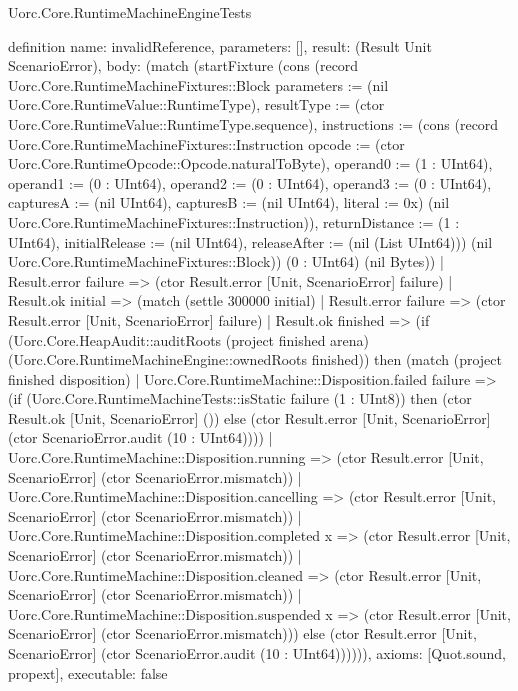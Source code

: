 \begin{lexlean}{Uorc.Core.RuntimeMachineEngineTests}
\begin{semanticmodule}
definition{
  name: invalidReference,
  parameters: [],
  result: (Result Unit ScenarioError),
  body: (match (startFixture (cons (record Uorc.Core.RuntimeMachineFixtures::Block {parameters := (nil Uorc.Core.RuntimeValue::RuntimeType), resultType := (ctor Uorc.Core.RuntimeValue::RuntimeType.sequence), instructions := (cons (record Uorc.Core.RuntimeMachineFixtures::Instruction {opcode := (ctor Uorc.Core.RuntimeOpcode::Opcode.naturalToByte), operand0 := (1 : UInt64), operand1 := (0 : UInt64), operand2 := (0 : UInt64), operand3 := (0 : UInt64), capturesA := (nil UInt64), capturesB := (nil UInt64), literal := 0x}) (nil Uorc.Core.RuntimeMachineFixtures::Instruction)), returnDistance := (1 : UInt64), initialRelease := (nil UInt64), releaseAfter := (nil (List UInt64))}) (nil Uorc.Core.RuntimeMachineFixtures::Block)) (0 : UInt64) (nil Bytes))
    | Result.error failure => (ctor Result.error [Unit, ScenarioError] failure)
    | Result.ok initial => (match (settle 300000 initial)
      | Result.error failure => (ctor Result.error [Unit, ScenarioError] failure)
      | Result.ok finished => (if (Uorc.Core.HeapAudit::auditRoots (project finished arena) (Uorc.Core.RuntimeMachineEngine::ownedRoots finished)) then (match (project finished disposition)
        | Uorc.Core.RuntimeMachine::Disposition.failed failure => (if (Uorc.Core.RuntimeMachineTests::isStatic failure (1 : UInt8)) then (ctor Result.ok [Unit, ScenarioError] ()) else (ctor Result.error [Unit, ScenarioError] (ctor ScenarioError.audit (10 : UInt64))))
        | Uorc.Core.RuntimeMachine::Disposition.running => (ctor Result.error [Unit, ScenarioError] (ctor ScenarioError.mismatch))
        | Uorc.Core.RuntimeMachine::Disposition.cancelling => (ctor Result.error [Unit, ScenarioError] (ctor ScenarioError.mismatch))
        | Uorc.Core.RuntimeMachine::Disposition.completed x => (ctor Result.error [Unit, ScenarioError] (ctor ScenarioError.mismatch))
        | Uorc.Core.RuntimeMachine::Disposition.cleaned => (ctor Result.error [Unit, ScenarioError] (ctor ScenarioError.mismatch))
        | Uorc.Core.RuntimeMachine::Disposition.suspended x => (ctor Result.error [Unit, ScenarioError] (ctor ScenarioError.mismatch))) else (ctor Result.error [Unit, ScenarioError] (ctor ScenarioError.audit (10 : UInt64)))))),
  axioms: [Quot.sound, propext],
  executable: false
}


\end{semanticmodule}
\end{lexlean}
